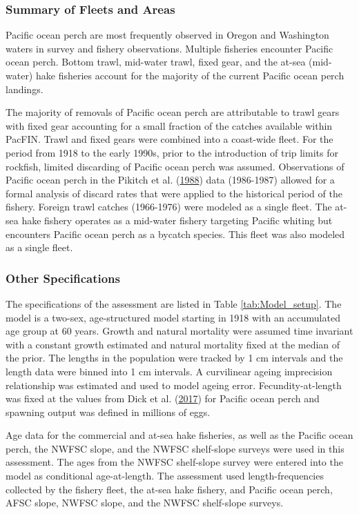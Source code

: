 \documentclass[12pt,]{article}
\begin{document}
\subsubsection{Summary of Fleets and
Areas}\label{summary-of-fleets-and-areas}

Pacific ocean perch are most frequently observed in Oregon and
Washington waters in survey and fishery observations. Multiple fisheries
encounter Pacific ocean perch. Bottom trawl, mid-water trawl, fixed
gear, and the at-sea (mid-water) hake fisheries account for the majority
of the current Pacific ocean perch landings.

The majority of removals of Pacific ocean perch are attributable to
trawl gears with fixed gear accounting for a small fraction of the
catches available within PacFIN. Trawl and fixed gears were combined
into a coast-wide fleet. For the period from 1918 to the early 1990s,
prior to the introduction of trip limits for rockfish, limited
discarding of Pacific ocean perch was assumed. Observations of Pacific
ocean perch in the Pikitch et al.
(\protect\hyperlink{ref-pikitch_evaluation_1988}{1988}) data (1986-1987)
allowed for a formal analysis of discard rates that were applied to the
historical period of the fishery. Foreign trawl catches (1966-1976) were
modeled as a single fleet. The at-sea hake fishery operates as a
mid-water fishery targeting Pacific whiting but encounters Pacific ocean
perch as a bycatch species. This fleet was also modeled as a single
fleet.

\subsubsection{Other Specifications}\label{other-specifications}

The specifications of the assessment are listed in Table
\ref{tab:Model_setup}. The model is a two-sex, age-structured model
starting in 1918 with an accumulated age group at 60 years. Growth and
natural mortality were assumed time invariant with a constant growth
estimated and natural mortality fixed at the median of the prior. The
lengths in the population were tracked by 1 cm intervals and the length
data were binned into 1 cm intervals. A curvilinear ageing imprecision
relationship was estimated and used to model ageing error.
Fecundity-at-length was fixed at the values from Dick et al.
(\protect\hyperlink{ref-dick_meta-analysis_2017}{2017}) for Pacific
ocean perch and spawning output was defined in millions of eggs.

Age data for the commercial and at-sea hake fisheries, as well as the
Pacific ocean perch, the NWFSC slope, and the NWFSC shelf-slope surveys
were used in this assessment. The ages from the NWFSC shelf-slope survey
were entered into the model as conditional age-at-length. The assessment
used length-frequencies collected by the fishery fleet, the at-sea hake
fishery, and Pacific ocean perch, AFSC slope, NWFSC slope, and the NWFSC
shelf-slope surveys.
\end{document}
